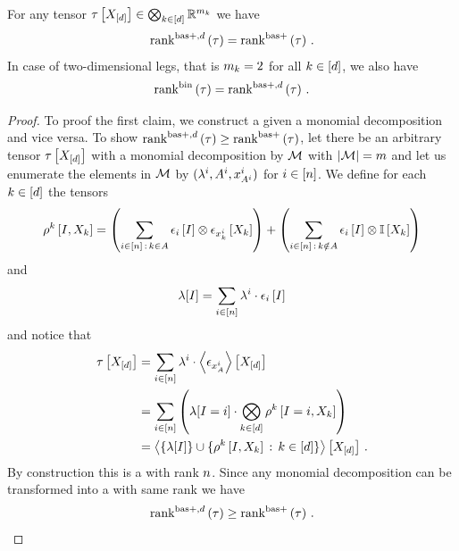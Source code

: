 \begin{theorem}
    For any tensor $\tau\left[X_{[d]}\right]\in\bigotimes_{k\in[d]} \mathbb{R}^{m_{k}}$ we have
    \begin{align*}
        \mathrm{rank}^{\mathrm{bas+},d}\left(\tau\right) = \mathrm{rank}^{\mathrm{bas+}}\left(\tau\right) \, .
    \end{align*}
    In case of two-dimensional legs, that is $m_{k}=2$ for all $k\in[d]$, we also have
    \begin{align*}
        \mathrm{rank}^{\mathrm{bin}}\left(\tau\right) = \mathrm{rank}^{\mathrm{bas+},d}\left(\tau\right)  \, .
    \end{align*}
\end{theorem}
\begin{proof}
    To proof the first claim, we construct a \basplusDecomposition{} given a monomial decomposition and vice versa.
    To show $\mathrm{rank}^{\mathrm{bas+},d}\left(\tau\right) \geq \mathrm{rank}^{\mathrm{bas+}}\left(\tau\right)$, let there be an arbitrary tensor $\tau\left[X_{[d]}\right]$ with a monomial decomposition by $\mathcal{M}$ with $\left|\mathcal{M}\right|=m$ and let us enumerate the elements in $\mathcal{M}$ by $(\lambda^{i}, A^{i}, x_{A^{i}}^{i})$ for $i\in[n]$.
    We define for each $k\in[d]$ the tensors
    \begin{align*}
        \rho^{k}\left[I,X_{k}\right]
        = \left( \sum_{i\in[n] \,:\, k\in A} \epsilon_{i}\left[I\right] \otimes \epsilon_{x_{k}^{i}}\left[X_{k}\right] \right)
        + \left(\sum_{i\in[n] \,:\, k\notin A} \epsilon_{i}\left[I\right] \otimes \mathbb{I}\left[X_{k}\right] \right)
    \end{align*}
    and
    \begin{align*}
        \lambda[I] = \sum_{i\in[n]} \lambda^{i} \cdot \epsilon_{i}\left[I\right]
    \end{align*}
    and notice that
    \begin{align*}
        \tau\left[X_{[d]}\right]
        & = \sum_{i\in[n]} \lambda^{i} \cdot \left\langle \epsilon_{x_{A}^{i}}\right\rangle \left[ X_{[d]} \right] \\
        & = \sum_{i\in[n]} \left(  \lambda[I=i] \cdot \bigotimes_{k\in[d]} \rho^{k}\left[I=i, X_{k}\right] \right) \\
        & = \left\langle 
            \{\lambda[I]\} \cup \{\rho^{k}\left[I,X_{k}\right] \,:\, k\in[d] \}
        \right\rangle \left[ X_{[d]} \right] \, .
    \end{align*}
    By construction this is a \basplusDecomposition{} with rank $n$.
    Since any monomial decomposition can be transformed into a \basplusDecomposition{} with same rank we have
    \begin{align*}
        \mathrm{rank}^{\mathrm{bas+},d}\left(\tau\right) \geq \mathrm{rank}^{\mathrm{bas+}}\left(\tau\right) \, .
    \end{align*}


\end{proof}
